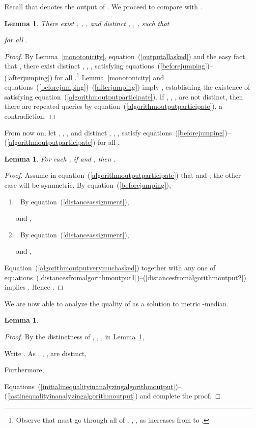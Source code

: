 \documentclass[letterpaper,12pt]{article}
\newtheorem{lemma}[theorem]{Lemma}
\begin{document}
Recall that  denotes the output of .
We proceed to
compare  with .

\begin{lemma}\label{identifyingjumps}
There exist
, , , 
and distinct , , , 
such that

for all .
\end{lemma}
\begin{proof}
By
Lemma~\ref{monotonicity}, equation~(\ref{outputallasked}) and the easy fact
that ,
there exist distinct , , ,  satisfying
equations~(\ref{beforejumping})--(\ref{afterjumping})
for all .\footnote{Observe that
 must go through all of , , ,  as 
increases from  to .}
Lemma~\ref{monotonicity} and
equations~(\ref{beforejumping})--(\ref{afterjumping}) imply
, establishing the existence of
 satisfying
equation~(\ref{algorithmoutputparticipate}).
If , , ,  are not distinct, then
there are repeated queries by
equation~(\ref{algorithmoutputparticipate}), a contradiction.
\end{proof}

From now on, let
, , , 
and distinct , , , 
satisfy
equations~(\ref{beforejumping})--(\ref{algorithmoutputparticipate})
for all .

\begin{lemma}\label{algorithmoutputtypicaldistances}
For each , if  and ,
then
.
\end{lemma}
\begin{proof}
Assume in equation~(\ref{algorithmoutputparticipate}) that
 and ; the other case will be symmetric.
By equation~(\ref{beforejumping}),

\begin{enumerate}[{Case }1:]
\item .
By equation~(\ref{distanceassignment}),

and ,

\item .
By equation~(\ref{distanceassignment}),

and ,

\end{enumerate}
Equation~(\ref{algorithmoutputverymuchasked})
together with any one of
equations~(\ref{distancesfromalgorithmoutput1})--(\ref{distancesfromalgorithmoutput2})
implies .
Hence .
\end{proof}

We are now able to analyze the quality of  as a solution to
{\sc metric -median}.

\begin{lemma}\label{analyzingalgorithmoutputassuboptimal}

\end{lemma}
\begin{proof}
By the distinctness of
, , ,  in
Lemma~\ref{identifyingjumps},

Write
.
As , , ,  are distinct,

Furthermore,

Equations~(\ref{initialinequalityinanalyzingalgorithmoutput})--(\ref{lastinequalityinanalyzingalgorithmoutput})
and  complete the proof.
\end{proof}
\end{document}

